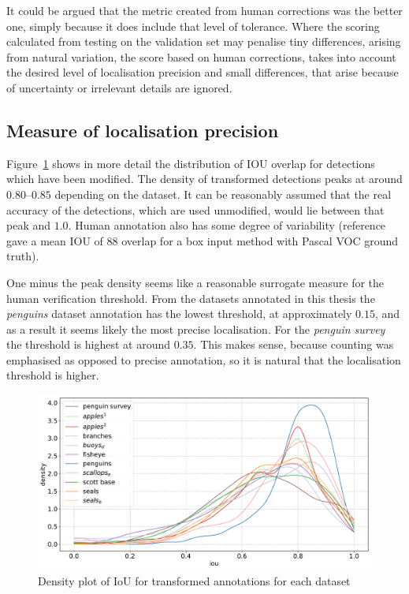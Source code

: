 It could be argued that the metric created from human corrections was the better one, simply because it does include that level of tolerance. Where the scoring calculated from testing on the validation set may penalise tiny differences, arising from natural variation, the score based on human corrections, takes into account the desired level of localisation precision and small differences, that arise because of uncertainty or irrelevant details are ignored.

\subsection {Measure of localisation precision}
\label{sec:localisation_precision}

Figure~\ref{fig:density_iou} shows in more detail the distribution of \gls{IOU} overlap for detections which have been modified. The density of transformed detections peaks at around $0.80$--$0.85$ depending on the dataset. It can be reasonably assumed that the real accuracy of the detections, which are used unmodified, would lie between that peak and $1.0$. Human annotation also has some degree of variability (reference \cite{Papadopoulos2017} gave a mean \gls{IOU} of 88 overlap for a box input method with Pascal VOC ground truth).

One minus the peak density seems like a reasonable surrogate measure for the human verification threshold. From the datasets annotated in this thesis the \emph{penguins} dataset annotation has the lowest threshold, at approximately $0.15$, and as a result it seems likely the most precise localisation. For the \emph{penguin survey} the threshold is highest at around $0.35$. This makes sense, because counting was emphasised as opposed to precise annotation, so it is natural that the localisation threshold is higher. 


\begin{figure}[ht]
\centering
\includegraphics[width=1.0\linewidth]{charts/scatters/iou_dataset.pdf}
\caption{ Density plot of IoU for transformed annotations for each dataset }
\label{fig:density_iou}
\end{figure}



